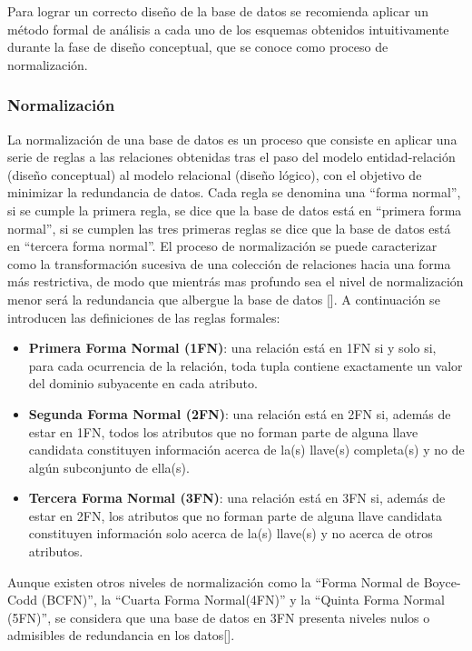 Para lograr un correcto diseño de la base de datos se recomienda aplicar un método formal de 
análisis a cada uno de los esquemas obtenidos intuitivamente durante la fase de diseño conceptual, 
que se conoce como proceso de normalización.

\subsubsection{Normalización}
La normalización de una base de datos es un proceso que consiste 
en aplicar una serie de reglas a las relaciones obtenidas 
tras el paso del modelo entidad-relación (diseño conceptual) al modelo 
relacional (diseño lógico), con el objetivo de minimizar la redundancia de datos.
Cada regla se denomina una ``forma normal'', si se cumple la primera regla, se dice que 
la base de datos está en ``primera forma normal'', si se cumplen las tres 
primeras reglas se dice que la base de datos está en ``tercera forma normal''. El proceso de 
normalización se puede caracterizar como la transformación sucesiva de una colección de 
relaciones hacia una forma más restrictiva, de modo que mientrás mas profundo sea el nivel 
de normalización menor será la redundancia que albergue la base de datos [\cite{db_book_cap4}].
A continuación se introducen las definiciones de las reglas formales:

\begin{itemize}
    \item \textbf{Primera Forma Normal (1FN)}: una relación está en 1FN si y solo si, para 
    cada ocurrencia de la relación, toda tupla contiene exactamente un valor del dominio subyacente en
    cada atributo.
    \item \textbf{Segunda Forma Normal (2FN)}: una relación está en 2FN si, además de estar en 
    1FN, todos los atributos que no forman parte de alguna llave candidata constituyen información 
    acerca de la(s) llave(s) completa(s) y no de algún subconjunto de ella(s).
    \item \textbf{Tercera Forma Normal (3FN)}: una relación está en 3FN si, además de estar en 2FN,
    los atributos que no forman parte de alguna llave candidata constituyen información solo acerca
    de la(s) llave(s) y no acerca de otros atributos.
\end{itemize}


Aunque existen otros niveles de normalización como la ``Forma Normal de Boyce-Codd (BCFN)'',
la ``Cuarta Forma Normal(4FN)'' y la ``Quinta Forma Normal (5FN)'',
se considera que una base de datos en 3FN presenta niveles nulos o 
admisibles de redundancia en los datos[\cite{ws_3FN}].





